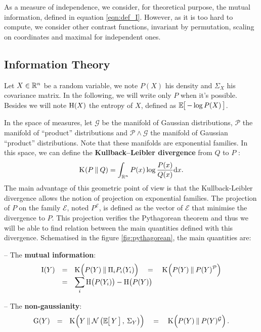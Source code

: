 \documentclass[a4paper]{article}
\newcommand{\Kl}[3][]{\mathrm K_{#1}\!\zp{#2\:\|\:#3}}
\newcommand{\zZ}[2]{\mathrm #1\!\zp{#2}}
\newcommand{\zD}{\mathcal}
\newcommand{\Ng}[2]{\mathcal{N}\zp{#1,\:#2}}
\newcommand{\zmev}[1]{\textbf{#1}}
\begin{document}
As a measure of independence, we consider, for theoretical purpose,
the mutual information, defined in equation \ref{eqn:def_I}.
However, as it is too hard to compute, we consider other contrast functions, invariant by permutation, scaling on coordinates and maximal for independent ones.



\subsection{Information Theory}
\label{infth}
Let $X\in\mathbb{R}^n$ be a random variable, we note $P(X)$ his density and $\Sigma_X$ his covariance matrix. In the following, we will write only $P$ when it's possible. Besides we will note $\zZ HX$ the entropy of $X$, defined as $\zesp{-\log P(X)}$.

\znl

In the space of measures, let $\zD G$ be the manifold of Gaussian distributions, $\zD P$ the manifold of ``product'' distributions and $\zD P\wedge\zD G$ the manifold of Gaussian ``product'' distributions. Note that these manifolds are exponential families.
In this space, we can define the \zmev{Kullback--Leibler divergence} from $Q$ to $P$ :
\begin{equation}
  \Kl PQ = \int_{\zR^n} P(x) \log\frac{P(x)}{Q(x)} \zdx x.
\end{equation}
The main advantage of this geometric point of view is that the Kullback-Leibler divergence allows the notion of projection on exponential families.
The projection of $P$ on the family $\zD E$, noted $P^{\zD E}$, is defined as the vector of $\zD E$ that minimise the divergence to $P$.
This projection verifies the Pythagorean theorem and thus we will be able to find relation between the main quantities defined with this divergence.
Schematised in the figure \ref{fig:pythagorean}, the main quantities are:

-- The \zmev{mutual information}:
\begin{equation}\label{eqn:def_I}\begin{array}{rcl}
  \zZ IY &=&\displaystyle \Kl {\zpbig2 P(Y)}{\Pi_i P_i(Y_i)} \quad=\quad \Kl {\zpbig2 P(Y)}{P(Y)^{\zD P}}\\
&=&\displaystyle \sum_i \zZ H{\zpbig1P(Y_i)} - \zZ H{\zpbig1P(Y)}
\end{array}\end{equation}

-- The \zmev{non-gaussianity}:
\begin{equation}\begin{array}{rcl}
  \zZ GY &=& \Kl{Y}{\Ng{\zesp Y}{\Sigma_Y}\zpbig2} \quad=\quad \Kl {\zpbig2 P(Y)}{P(Y)^{\zD G}}.
\end{array}\end{equation}
\end{document}
